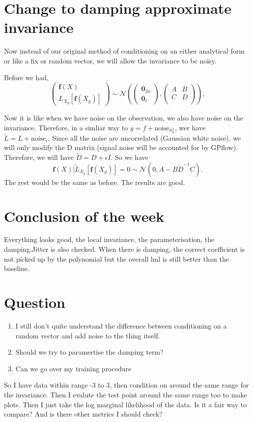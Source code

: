 \documentclass{article}
\begin{document}
\section*{Change to damping approximate invariance}
Now instead of our original method of conditioning on an either analytical form or like a fix or random vector, we will allow the invariance to be noisy.

Before we had, 
$$
\begin{pmatrix}
  \mathbf{f}(X) \\ L_{X_g}[\mathbf{f}(X_g)]
\end{pmatrix}
\sim \mathcal{N}
\left(
\begin{pmatrix}
  \mathbf{0}_{2n} \\ \mathbf{0}_{\ell}
\end{pmatrix},
\begin{pmatrix}
A & B \\C&D\\
\end{pmatrix}
\right), 
$$

Now it is like when we have noise on the observation, we also have noise on the invariance. 
Therefore, in a simliar way to $y=f+\text{noise}_{\sigma^2_n}$, wer have $\tilde{L} = L+\text{noise}_{\epsilon}$. 
Since all the noise are uncorrelated (Gaussian white noise), we will only modify the D matrix (signal noise will be accounted for by GPflow).
Therefore, we will have $\tilde{D}=D+\epsilon I$.
So we have 
$$
\mathbf{f}(X) | \tilde{L}_{X_g}[\mathbf{f}(X_g)]=0 \sim \mathcal{N} \left(0, A-B\tilde{D}^{-1}C\right).
$$
The rest would be the same as before. 
The results are good.
\section*{Conclusion of the week}
Everything looks good, the local invariance, the parameterisation, the damping.Jitter is also checked.  
When there is damping, the correct coefficient is not picked up by the polynomial but the overall lml is still better than the baseline.
\section*{Question}
\begin{enumerate}
  \item I still don't quite understand the difference between conditioning on a random vector and add noise to the thing itself.
  \item Should we try to paramertise the damping term?
  \item Can we go over my training procedure
\end{enumerate}
So I have data within range -3 to 3, then condition on around the same range for the invariance. 
Then I evalute the test point around the same range too to make plots.
Then I just take the log marginal likelihood of the data.
Is it a fair way to compare? And is there other metrics I should check?
\end{document}
